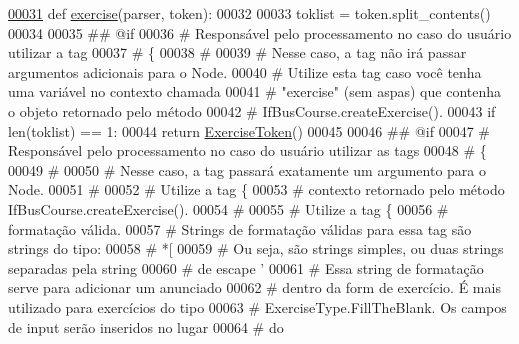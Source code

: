 \begin{DoxyCode}
\hypertarget{namespaceCourse_1_1templatetags_1_1exercises_l00031}{}\hyperlink{namespaceCourse_1_1templatetags_1_1exercises_a8c8aa0687de6cfe821c8acaecafba711}{00031} \textcolor{keyword}{def }\hyperlink{namespaceCourse_1_1templatetags_1_1exercises_a8c8aa0687de6cfe821c8acaecafba711}{exercise}(parser, token):
00032 
00033     toklist = token.split\_contents()
00034 
00035     \textcolor{comment}{## @if}
00036     \textcolor{comment}{#   Responsável pelo processamento no caso do usuário utilizar a tag}
00037     \textcolor{comment}{# \{%
00038     \textcolor{comment}{#}
00039     \textcolor{comment}{#   Nesse caso, a tag não irá passar argumentos adicionais para o Node.}
00040     \textcolor{comment}{#   Utilize esta tag caso você tenha uma variável no contexto chamada}
00041     \textcolor{comment}{#   "exercise" (sem aspas) que contenha o objeto retornado pelo método}
00042     \textcolor{comment}{#   IfBusCourse.createExercise().}
00043     \textcolor{keywordflow}{if} len(toklist) == 1:
00044         \textcolor{keywordflow}{return} \hyperlink{classCourse_1_1templatetags_1_1exercises_1_1ExerciseToken}{ExerciseToken}()
00045 
00046     \textcolor{comment}{## @if}
00047     \textcolor{comment}{#   Responsável pelo processamento no caso do usuário utilizar as tags}
00048     \textcolor{comment}{# \{%
00049     \textcolor{comment}{#}
00050     \textcolor{comment}{#   Nesse caso, a tag passará exatamente um argumento para o Node.}
00051     \textcolor{comment}{#}
00052     \textcolor{comment}{#   Utilize a tag \{%
00053     \textcolor{comment}{# contexto retornado pelo método IfBusCourse.createExercise().}
00054     \textcolor{comment}{#}
00055     \textcolor{comment}{#   Utilize a tag \{%
00056     \textcolor{comment}{# formatação válida.}
00057     \textcolor{comment}{#   Strings de formatação válidas para essa tag são strings do tipo:}
00058     \textcolor{comment}{#       *[%
00059     \textcolor{comment}{#   Ou seja, são strings simples, ou duas strings separadas pela string}
00060     \textcolor{comment}{# de escape '%
00061     \textcolor{comment}{#   Essa string de formatação serve para adicionar um anunciado}
00062     \textcolor{comment}{# dentro da form de exercício. É mais utilizado para exercícios do tipo}
00063     \textcolor{comment}{# ExerciseType.FillTheBlank. Os campos de input serão inseridos no lugar}
00064     \textcolor{comment}{# do %
}}}}}}}
\end{DoxyCode}
